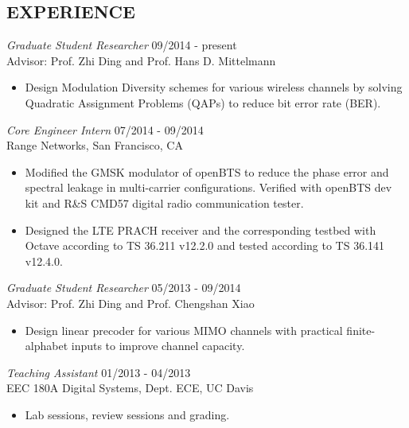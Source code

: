 \documentclass[margin]{res} %
\begin{document}
\begin{resume}
     
        \section{EXPERIENCE}
        {\sl Graduate Student Researcher} \hfill 09/2014 - present \\
        Advisor: Prof. Zhi Ding and Prof. Hans D. Mittelmann
        \begin{itemize} 
            \item Design Modulation Diversity schemes for various wireless
            channels by solving Quadratic Assignment Problems (QAPs) to
            reduce bit error rate (BER).
        \end{itemize} 
        
        {\sl Core Engineer Intern} \hfill 07/2014 - 09/2014 \\
        Range Networks, San Francisco, CA
        \begin{itemize} \itemsep -2pt %
            \item Modified the GMSK modulator of openBTS to reduce the phase
            error and spectral leakage in multi-carrier configurations. Verified
            with openBTS dev kit and R\&S CMD57 digital radio communication
            tester.
            \item Designed the LTE PRACH receiver and the corresponding testbed with
            Octave according to TS 36.211 v12.2.0 and tested according to TS 36.141
            v12.4.0.
        \end{itemize}
     
        {\sl Graduate Student Researcher} \hfill 05/2013 - 09/2014 \\
        Advisor: Prof. Zhi Ding and Prof. Chengshan Xiao 
        \begin{itemize} 
            \item Design linear precoder for various MIMO channels with
            practical finite-alphabet inputs to improve channel capacity.
        \end{itemize} 
        
        {\sl Teaching Assistant} \hfill 01/2013 - 04/2013 \\
        EEC 180A Digital Systems, Dept. ECE, UC Davis
        \begin{itemize} 
            \item Lab sessions, review sessions and grading.
        \end{itemize} 
    

\end{resume}
\end{document}
